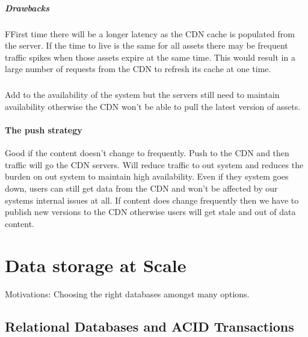 \documentclass[a4paper, 11pt]{book}
\begin{document}
    \paragraph{Drawbacks}
    FFirst time there will be a longer latency as the CDN cache is populated from the server.
    If the time to live is the same for all assets there may be frequent traffic spikes when those assets expire at the same time.
    This would result in a large number of requests from the CDN to refresh its cache at one time.

    \paragraph{}
    Add to the availability of the system but the servers still need to maintain availability otherwise the CDN won't be able to pull the latest version of assets.

    \subsubsection{The push strategy}
    Good if the content doesn't change to frequently.
    Push to the CDN and then traffic will go the CDN servers.
    Will reduce traffic to out system and reduces the burden on out system to maintain high availability.
    Even if they system goes down, users can still get data from the CDN and won't be affected by our systems internal issues at all.
    If content does change frequently then we have to publish new versions to the CDN otherwise users will get stale and out of data content.

    \chapter{Data storage at Scale}
    Motivations: Choosing the right databases amongst many options.

    \section{Relational Databases and ACID Transactions}
\end{document}
